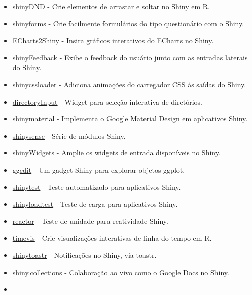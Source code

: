 \documentclass[
]{book}
\begin{document}
\begin{itemize}
\item
  \href{https://github.com/ayayron/shinydnd}{shinyDND} - Crie elementos de arrastar e soltar no Shiny em R.
\item
  \href{https://github.com/daattali/shinyforms}{shinyforms} - Crie facilmente formulários do tipo questionário com o Shiny.
\item
  \href{https://github.com/XD-DENG/ECharts2Shiny}{ECharts2Shiny} - Insira gráficos interativos do ECharts no Shiny.
\item
  \href{https://merlinoa.github.io/shinyFeedback/}{shinyFeedback} - Exibe o feedback do usuário junto com as entradas laterais do Shiny.
\item
  \href{https://github.com/daattali/shinycssloaders}{shinycssloader} - Adiciona animações do carregador CSS às saídas do Shiny.
\item
  \href{https://github.com/wleepang/shiny-directory-input}{directoryInput} - Widget para seleção interativa de diretórios.
\item
  \href{https://ericrayanderson.github.io/shinymaterial/}{shinymaterial} - Implementa o Google Material Design em aplicativos Shiny.
\item
  \href{http://nickstrayer.me/shinysense/}{shinysense} - Série de módulos Shiny.
\item
  \href{https://dreamrs.github.io/shinyWidgets/index.html}{shinyWidgets} - Amplie os widgets de entrada disponíveis no Shiny.
\item
  \href{https://yonicd.github.io/ggedit/}{ggedit} - Um gadget Shiny para explorar objetos ggplot.
\item
  \href{https://rstudio.github.io/shinytest/}{shinytest} - Teste automatizado para aplicativos Shiny.
\item
  \href{https://rstudio.github.io/shinyloadtest/}{shinyloadtest} - Teste de carga para aplicativos Shiny.
\item
  \href{https://yonicd.github.io/reactor/}{reactor} - Teste de unidade para reatividade Shiny.
\item
  \href{https://daattali.com/shiny/timevis-demo/}{timevis} - Crie visualizações interativas de linha do tempo em R.
\item
  \href{https://github.com/MangoTheCat/shinytoastr}{shinytoastr} - Notificações no Shiny, via toastr.
\item
  \href{https://appsilon.github.io/shiny.collections/}{shiny.collections} - Colaboração ao vivo como o Google Docs no Shiny.
\item

\end{itemize}
\end{document}
